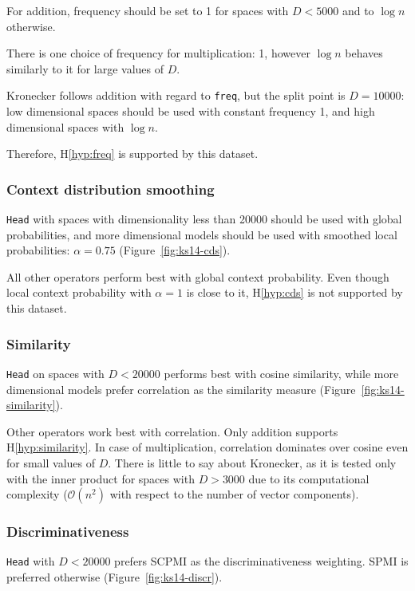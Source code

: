 For addition, frequency should be set to 1 for spaces with $D < 5000$ and to $\log n$ otherwise.

There is one choice of frequency for multiplication: 1, however $\log n$ behaves similarly to it for large values of $D$.

Kronecker follows addition with regard to \texttt{freq}, but the split point is $D = 10000$: low dimensional spaces should be used with constant frequency 1, and high dimensional spaces with $\log n$.

Therefore, H\ref{hyp:freq} is supported by this dataset.

\subsubsection{Context distribution smoothing}


\texttt{Head} with spaces with dimensionality less than 20000 should be used with global probabilities, and more dimensional models should be used with smoothed local probabilities: $\alpha = 0.75$ (Figure~\ref{fig:ks14-cds}).

All other operators perform best with global context probability. Even though local context probability with $\alpha = 1$ is close to it, H\ref{hyp:cds} is not supported by this dataset.

\subsubsection{Similarity}
\texttt{Head} on spaces with $D < 20000$ performs best with cosine similarity, while more dimensional models prefer correlation as the similarity measure (Figure~\ref{fig:ks14-similarity}).

Other operators work best with correlation. Only addition supports H\ref{hyp:similarity}. In case of multiplication, correlation dominates over cosine even for small values of $D$. There is little to say about Kronecker, as it is tested only with the inner product for spaces with $D > 3000$ due to its computational complexity ($\mathcal{O}(n^2)$ with respect to the number of vector components).

\subsubsection{Discriminativeness}


\texttt{Head} with $D < 20000$ prefers SCPMI as the discriminativeness weighting. SPMI is preferred otherwise (Figure~\ref{fig:ks14-discr}).

